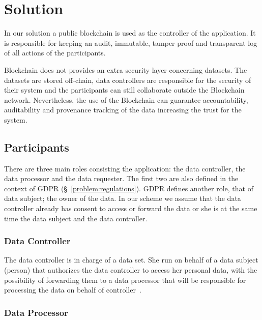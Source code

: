 \chapter{Solution}
\label{solution}

In our solution a public blockchain is used as the controller of the application. It is responsible for keeping an
audit, immutable, tamper-proof and transparent log of all actions of the participants.

Blockchain does not provides an extra security layer concerning datasets. The datasets are stored off-chain, data controllers are responsible for the security of their system and the participants can still collaborate outside the Blockchain network. Nevertheless, the use of the Blockchain can guarantee accountability, auditability and provenance tracking of the data increasing the trust for the system.

\section{Participants}
\label{solution:entities}

There are three main roles consisting the application: the data controller, the data processor
and the data requester. The first two are also defined in the context of GDPR (§~\ref{problem:regulations}).
GDPR defines another role, that of data subject; the owner of the data.
In our scheme we assume that the data controller already has consent to access or forward the data or she is at the same time the data subject and the data controller.

\subsection{Data Controller}
\label{solution:entities:data_controller}

The data controller is in charge of a data set. She run on behalf of a data subject (person)
that authorizes the data controller to access her personal data, with the possibility of forwarding
them to a data processor that will be responsible for processing the data on behalf of controller~\cite{DBLP:journals/corr/NeisseSF17}.

\subsection{Data Processor}
\label{solution:entities:data_processor}

